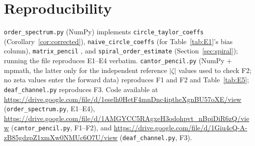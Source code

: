 \documentclass[11pt, a4paper]{article}
\theoremstyle{definition}
\theoremstyle{remark}
\begin{document}
\section{Reproducibility}\label{app:repro}

\begin{sloppypar}
\texttt{order\_spectrum.py} (NumPy) implements
\texttt{circle\_taylor\_coeffs} (Corollary~\ref{cor:corrected}),
\texttt{naive\_circle\_coeffs} (for Table~\ref{tab:E1}'s bias column),
\texttt{matrix\_pencil} \cite{HuaSarkar1990}, and
\texttt{spiral\_order\_estimate} (Section~\ref{sec:spiral}); running the
file reproduces E1--E4 verbatim. \texttt{cantor\_pencil.py} (NumPy +
mpmath, the latter only for the independent reference $|\zeta|$ values
used to check F2; no zeta values enter the forward data) reproduces F1 and
F2 and Table~\ref{tab:E5}; \texttt{deaf\_channel.py} reproduces F3. Code
available at
\url{https://drive.google.com/file/d/1eselh0HetF4mnDnc4iptheXgnBU57oXE/view}
(\texttt{order\_spectrum.py}, E1--E4),
\url{https://drive.google.com/file/d/1AMGYCC5RAgxeH3odohpvt_nBpiDiR6zQ/view}
(\texttt{cantor\_pencil.py}, F1--F2), and
\url{https://drive.google.com/file/d/1Giu4cQ-A-zB85gdzpZ1xmXw0NMUc6O7U/view}
(\texttt{deaf\_channel.py}, F3).
\end{sloppypar}
\end{document}
